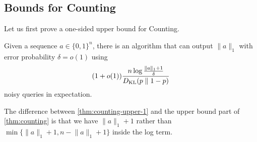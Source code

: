 \subsection{Bounds for Counting}

Let us first prove a one-sided upper bound for Counting.
\begin{theorem}
\label{thm:counting-upper-1}
  Given a sequence $a \in \{0, 1\}^n$, there is an algorithm that can output $\lVert a \rVert_1$ with error probability $\delta = o(1)$ using
  \[
  (1+o(1))\frac{n \log \frac{\lVert a \rVert_1 + 1}{\delta}}{D_{\operatorname{\mathrm{KL}}}(p \parallel 1-p)}
  \]
  noisy queries in expectation.
\end{theorem}
The difference between \cref{thm:counting-upper-1} and the upper bound part of \cref{thm:counting} is that we have $\lVert a \rVert_1 + 1$ rather than $\min\{\lVert a \rVert_1 + 1, n-\lVert a \rVert_1 + 1\}$ inside the log term.
